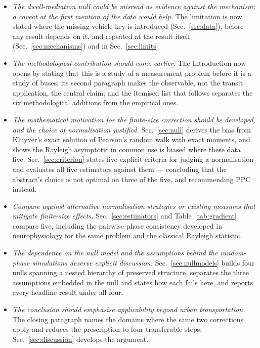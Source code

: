 \documentclass[9pt,twocolumn,twoside]{opticajnl}
\begin{document}
\begin{itemize}\itemsep2pt
\item \emph{The dwell-mediation null could be misread as evidence against the mechanism; a
      caveat at the first mention of the data would help.} The limitation is now stated where
      the missing vehicle key is introduced (Sec.~\ref{sec:data}), before any result depends on
      it, and repeated at the result itself (Sec.~\ref{sec:mechanisms}) and in
      Sec.~\ref{sec:limits}.
\item \emph{The methodological contribution should come earlier.} The Introduction now opens by
      stating that this is a study of a measurement problem before it is a study of buses; its
      second paragraph makes the observable, not the transit application, the central claim; and
      the itemised list that follows separates the six methodological additions from the
      empirical ones.
\item \emph{The mathematical motivation for the finite-size correction should be developed, and
      the choice of normalisation justified.} Sec.~\ref{sec:null} derives the bias from
      Kluyver's exact solution of Pearson's random walk with exact moments, and shows the
      Rayleigh asymptotic in common use is biased where these data live.
      Sec.~\ref{sec:criterion} states five explicit criteria for judging a normalisation and
      evaluates all five estimators against them --- concluding that the abstract's choice is
      not optimal on three of the five, and recommending PPC instead.
\item \emph{Compare against alternative normalisation strategies or existing measures that
      mitigate finite-size effects.} Sec.~\ref{sec:estimators} and Table~\ref{tab:gradient}
      compare five, including the pairwise phase consistency developed in neurophysiology for
      the same problem \cite{vinck10} and the classical Rayleigh statistic.
\item \emph{The dependence on the null model and the assumptions behind the random-phase
      simulations deserve explicit discussion.} Sec.~\ref{sec:nullmodels} builds four nulls
      spanning a nested hierarchy of preserved structure, separates the three assumptions
      embedded in the null and states how each fails here, and reports every headline result
      under all four.
\item \emph{The conclusion should emphasise applicability beyond urban transportation.} The
      closing paragraph names the domains where the same two corrections apply and reduces the
      prescription to four transferable steps; Sec.~\ref{sec:discussion} develops the argument.
\end{itemize}
\end{document}
